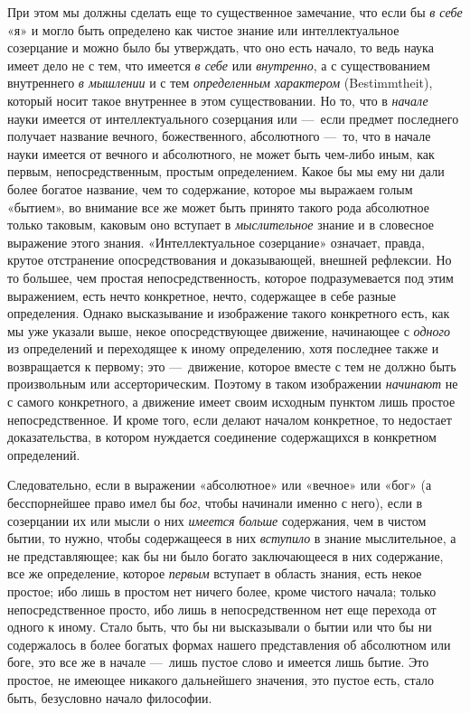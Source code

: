 При этом мы должны сделать еще то существенное замечание, что если бы
{\em в себе} «я» и могло быть определено как чистое
знание или интеллектуальное созерцание и можно было бы утверждать, что оно
есть начало, то ведь наука имеет дело не с тем, что имеется
{\em в себе} или {\em внутренно}, а
с существованием внутреннего {\em в мышлении} и с тем
{\em определенным характером} (Bestimmtheit), который
носит такое внутреннее в этом существовании. Но то, что в
{\em начале} науки имеется от интеллектуального
созерцания или —~если предмет последнего получает название вечного,
божественного, абсолютного —~то, что в начале науки имеется от вечного и
абсолютного, не может быть чем-либо иным, как первым, непосредственным,
простым определением. Какое бы мы ему ни дали более богатое название, чем
то содержание, которое мы выражаем голым «бытием», во внимание все же может
быть принято такого рода абсолютное только таковым, каковым оно вступает в
{\em мыслительное} знание и в словесное выражение этого
знания. «Интеллектуальное созерцание» означает, правда, крутое отстранение
опосредствования и доказывающей, внешней рефлексии. Но то большее, чем
простая непосредственность, которое подразумевается под этим выражением,
есть нечто конкретное, нечто, содержащее в себе разные определения. Однако
высказывание и изображение такого конкретного есть, как мы уже указали
выше, некое опосредствующее движение, начинающее с
{\em одного} из определений и переходящее к иному
определению, хотя последнее также и возвращается к первому; это —~движение,
которое вместе с тем не должно быть произвольным или ассерторическим.
Поэтому в таком изображении {\em начинают} не с самого
конкретного, а движение имеет своим исходным пунктом лишь простое
непосредственное. И кроме того, если делают началом конкретное, то
недостает доказательства, в котором нуждается соединение содержащихся в
конкретном определений.

Следовательно, если в выражении «абсолютное» или «вечное» или «бог» (а
бесспорнейшее право имел бы {\em бог}, чтобы начинали
именно с него), если в созерцании их или мысли о них
{\em имеется больше} содержания, чем в чистом бытии, то
нужно, чтобы содержащееся в них {\em вступило} в знание
мыслительное, а не представляющее; как бы ни было богато заключающееся в
них содержание, все же определение, которое
{\em первым} вступает в область знания, есть некое
простое; ибо лишь в простом нет ничего более, кроме чистого начала; только
непосредственное просто, ибо лишь в непосредственном нет еще перехода от
одного к иному. Стало быть, что бы ни высказывали о бытии или что бы ни
содержалось в более богатых формах нашего представления об абсолютном или
боге, это все же в начале —~лишь пустое слово и имеется лишь бытие. Это
простое, не имеющее никакого дальнейшего значения, это пустое есть, стало
быть, безусловно начало философии.

